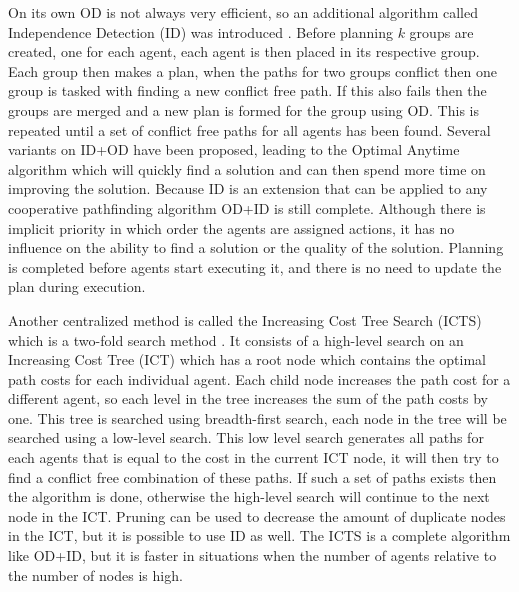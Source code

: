 On its own OD is not always very efficient, so an additional algorithm called
Independence Detection (ID) was introduced \cite{standley2010}. Before planning
$k$ groups are created, one for each agent, each agent is then placed in its
respective group. Each group then makes a
plan, when the paths for two groups conflict then one group is tasked with
finding a new conflict free path. If this also fails then the groups are merged
and a new plan is formed for the group using OD. This is repeated until a
set of conflict free paths for all agents has been found. Several variants on
ID+OD have been proposed, leading to the Optimal Anytime algorithm
\cite{standley2011} which will quickly find a solution and can then spend more
time on improving the solution. Because ID is an extension that can be applied
to any cooperative pathfinding algorithm OD+ID is still complete. Although
there is implicit priority in which order the agents are assigned actions, it
has no influence on the ability to find a solution or the quality of the
solution. Planning is completed before agents start executing it, and there is
no need to update the plan during execution.

Another centralized method is called the Increasing Cost Tree Search (ICTS)
which is a
two-fold search method \cite{sharon2013}. It consists of a high-level search on
an Increasing Cost Tree (ICT) which has a root node which contains the optimal
path costs for each individual agent. Each child node increases the path cost
for a different agent, so each level in the tree increases the sum of the path
costs by one. This tree is searched using breadth-first search, each node in
the tree will be searched using a low-level search. This low level search
generates all paths for each agents that is equal to the cost in the current
ICT node, it will then try to find a conflict free combination of these paths.
If such a set of paths exists then the algorithm is done, otherwise the
high-level search will continue to the next node in the ICT. Pruning can be
used to decrease the amount of duplicate nodes in the ICT, but it is possible
to use ID as well. The ICTS is a complete algorithm like OD+ID, but it is
faster in situations when the number of agents relative to the number of nodes
is high.


